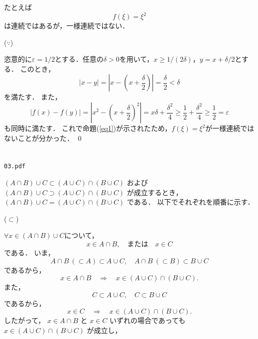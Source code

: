\documentclass[uplatex,11pt]{jsarticle}
\def\shoumon#1{\vspace{1em}\noindent\ovalbox{\textsf{ #1 }}}
\begin{document}
\shoumon{(c)}

たとえば
\begin{equation*}
	f(\xi) = \xi^2
\end{equation*}
は連続ではあるが，一様連続ではない．

($\because$)

恣意的に$\varepsilon=1/2$とする．任意の$\delta>0$を用いて，$x \geq 1/(2\delta)$，$y=x+\delta/2$とする．
このとき，
\begin{equation*}
	|x-y| =\left|x-\left(x+\frac{\delta}{2}\right)\right| = \frac{\delta}{2}
	< \delta
\end{equation*}
を満たす．
また，
\begin{equation*}
	|f(x)-f(y)|
	= \left|x^2-\left(x+\frac{\delta}{2}\right)^2\right| 
	= x\delta + \frac{\delta^2}{4} 
	\geq \frac{1}{2} + \frac{\delta^2}{4} 
	\geq \frac{1}{2}
	= \varepsilon
\end{equation*}
も同時に満たす．
これで命題(\ref{eq1})が示されたため，$f(\xi)=\xi^2$が一様連続ではないことが分かった． \qed

\newpage
\section{}

\begin{shadebox}
	\begin{center}
		\texttt{03.pdf}
	\end{center}
\end{shadebox}

\shoumon{分配律 1}

$(A \cap B) \cup C \subset (A \cup C) \cap (B \cup C)$
および
$(A \cap B) \cup C \supset (A \cup C) \cap (B \cup C)$
が成立するとき，
$(A \cap B) \cup C = (A \cup C) \cap (B \cup C)$
である．
以下でそれぞれを順番に示す．

($\subset$)

$\forall x \in (A \cap B) \cup C$について，
\begin{equation*}
	x \in A \cap B,
	\quad \text{または} \quad
	x \in C
\end{equation*}
である．
いま，
\begin{equation*}
	A \cap B \ (\subset A) \subset A \cup C, \quad
	A \cap B \ (\subset B) \subset B \cup C
\end{equation*}
であるから，
\begin{equation*}
	x \in A \cap B
	\quad \Longrightarrow \quad
	x \in (A \cup C) \cap (B \cup C).
\end{equation*}
また，
\begin{equation*}
	C \subset A \cup C, \quad
	C \subset B \cup C
\end{equation*}
であるから，
\begin{equation*}
	x \in C
	\quad \Longrightarrow \quad
	x \in (A \cup C) \cap (B \cup C).
\end{equation*}
したがって，
$x \in A \cap B$ と $x \in C$
いずれの場合であっても
$x \in (A \cup C) \cap (B \cup C)$
が成立し，
\end{document}
